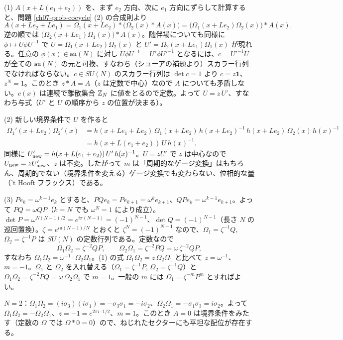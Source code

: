 \begin{solution}
(1) $A(x+L(e_1+e_2))$ を、まず $e_2$ 方向、次に $e_1$ 方向にずらして計算すると、問題 \ref{ch07-prob-cocycle} (2) の合成則より
\[
A(x+Le_2+Le_1)=\Omega_1(x+Le_2)\ast\bigl(\Omega_2(x)\ast A(x)\bigr)=\bigl(\Omega_1(x+Le_2)\Omega_2(x)\bigr)\ast A(x).
\]
逆の順では $\bigl(\Omega_2(x+Le_1)\Omega_1(x)\bigr)\ast A(x)$。随伴場についても同様に $\phi\mapsto U\phi U^{-1}$ で $U=\Omega_1(x+Le_2)\Omega_2(x)$ と $U'=\Omega_2(x+Le_1)\Omega_1(x)$ が現れる。任意の $\phi(x)\in\mathfrak{su}(N)$ に対し $U\phi U^{-1}=U'\phi U'^{-1}$ となるには、$c=U'^{-1}U$ が全ての $\mathfrak{su}(N)$ の元と可換、すなわち（シューアの補題より）スカラー行列でなければならない。$c\in SU(N)$ のスカラー行列は $\det c=1$ より $c=z\mathbf 1$、$z^N=1$。このとき $z\ast A=A$（$z$ は定数で中心）なので $A$ についても矛盾しない。$c(x)$ は連続で離散集合 $\mathbb{Z}_N$ に値をとるので定数。よって $U=z\,U'$、すなわち与式（$U'$ と $U$ の順序から $z$ の位置が決まる）。

(2) 新しい境界条件で $U$ を作ると
\[
\begin{aligned}\Omega_1'(x+Le_2)\Omega_2'(x)&=h(x+Le_1+Le_2)\,\Omega_1(x+Le_2)\,h(x+Le_2)^{-1}\,h(x+Le_2)\,\Omega_2(x)\,h(x)^{-1}\\&=h(x+L(e_1+e_2))\,U\,h(x)^{-1}.\end{aligned}
\]
同様に $U'_{\rm new}=h(x+L(e_1+e_2))\,U'\,h(x)^{-1}$。$U=zU'$ で $z$ は中心なので $U_{\rm new}=zU'_{\rm new}$、$z$ は不変。したがって $m$ は「周期的なゲージ変換」はもちろん、周期的でない（境界条件を変える）ゲージ変換でも変わらない、位相的な量（'t Hooft フラックス）である。

(3) $P e_k=\omega^{k-1}e_k$ とすると、$PQe_k=Pe_{k+1}=\omega^ke_{k+1}$、$QPe_k=\omega^{k-1}e_{k+1}$。よって $PQ=\omega QP$（$k=N$ でも $\omega^N=1$ により成立）。$\det P=\omega^{N(N-1)/2}=e^{i\pi(N-1)}=(-1)^{N-1}$、$\det Q=(-1)^{N-1}$（長さ $N$ の巡回置換）。$\zeta=e^{i\pi(N-1)/N}$ とおくと $\zeta^N=(-1)^{N-1}$ なので、$\Omega_1=\zeta^{-1}Q$, $\Omega_2=\zeta^{-1}P$ は $SU(N)$ の定数行列である。定数なので
\[
\Omega_1\Omega_2=\zeta^{-2}QP,\qquad \Omega_2\Omega_1=\zeta^{-2}PQ=\omega\,\zeta^{-2}QP,
\]
すなわち $\Omega_1\Omega_2=\omega^{-1}\cdot\Omega_2\Omega_1$。(1) の式 $\Omega_1\Omega_2=z\,\Omega_2\Omega_1$ と比べて $z=\omega^{-1}$、$m=-1$。$\Omega_1$ と $\Omega_2$ を入れ替える（$\Omega_1=\zeta^{-1}P$, $\Omega_2=\zeta^{-1}Q$）と $\Omega_1\Omega_2=\zeta^{-2}PQ=\omega\,\Omega_2\Omega_1$ で $m=1$。一般の $m$ には $\Omega_1=\zeta^{-m}P^m$ とすればよい。

$N=2$：$\Omega_1\Omega_2=(i\sigma_3)(i\sigma_1)=-\sigma_3\sigma_1=-i\sigma_2$、$\Omega_2\Omega_1=-\sigma_1\sigma_3=i\sigma_2$。よって $\Omega_1\Omega_2=-\Omega_2\Omega_1$、$z=-1=e^{2\pi i\cdot1/2}$、$m=1$。このとき $A=0$ は境界条件をみたす（定数の $\Omega$ では $\Omega\ast0=0$）ので、ねじれたセクターにも平坦な配位が存在する。


\end{solution}
